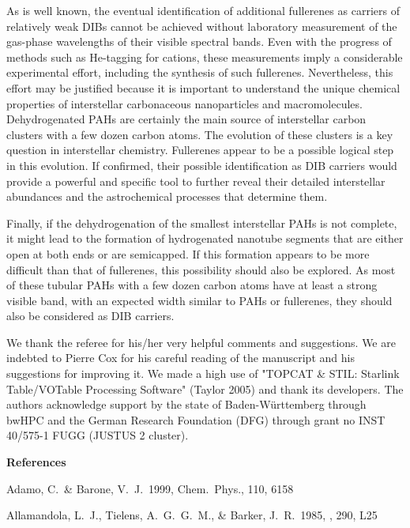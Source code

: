 \documentclass{aa}
\begin{document}
As is well known, the eventual identification of additional fullerenes as carriers of relatively weak DIBs cannot be achieved without laboratory measurement of the gas-phase wavelengths of their visible spectral bands. Even with the progress of methods such as He-tagging for cations, these measurements imply a considerable experimental effort, including the synthesis of such fullerenes. Nevertheless, this effort may be justified because it is important to understand the unique chemical properties of interstellar carbonaceous nanoparticles and macromolecules. Dehydrogenated PAHs are certainly the main source of interstellar carbon clusters with a few dozen carbon atoms. The evolution of these clusters is a key question in interstellar chemistry.
Fullerenes appear to be a possible logical step in this evolution. If confirmed, their possible identification as DIB carriers would provide a powerful and specific tool to further reveal their detailed interstellar abundances and the astrochemical processes that determine them. 

Finally, if the dehydrogenation of the smallest interstellar PAHs is not complete, it might lead to the formation of hydrogenated nanotube segments that are either open at both ends or are semicapped. 
If this formation appears to be more difficult than that of fullerenes, this possibility should also be explored.
As  most of these tubular PAHs with a few dozen carbon atoms have at least a strong visible band, with an expected width similar to PAHs or fullerenes, they should also be considered as DIB carriers.

\bigskip
\begin{acknowledgements}
We thank the referee for his/her very helpful comments and suggestions. 
We are indebted 
to Pierre Cox for his careful reading of the manuscript and his suggestions for improving it. 
We made a high use of "TOPCAT \& STIL: Starlink Table/VOTable Processing Software" (Taylor 2005) and thank its developers.
The authors acknowledge support by the state of Baden-Württemberg through bwHPC
and the German Research Foundation (DFG) through grant no INST 40/575-1 FUGG (JUSTUS 2 cluster). 
\end{acknowledgements}

\bigskip

{\bf References}  
\bigskip

Adamo, C.\ \& Barone, V.~J.\ 1999, Chem.\ Phys., 110, 6158

Allamandola, L.~J., Tielens, A.~G.~G.~M., \& Barker, J.~R.\ 1985, \apjl, 290, L25
\end{document}
